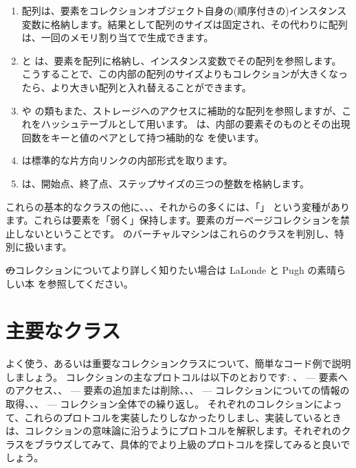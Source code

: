 \documentclass[a4paper,10pt,twoside]{book}
\begin{document}
\begin{enumerate}
  \item 配列は、要素をコレクションオブジェクト自身の(順序付きの)インスタンス変数に格納します。結果として配列のサイズは固定され、その代わりに配列は、一回のメモリ割り当てで生成できます。
  \item {} と  は、要素を配列に格納し、インスタンス変数でその配列を参照します。
  こうすることで、この内部の配列のサイズよりもコレクションが大きくなったら、より大きい配列と入れ替えることができます。
  \item {} や  の類もまた、ストレージへのアクセスに補助的な配列を参照しますが、これをハッシュテーブルとして用います。 は、内部の要素そのものとその出現回数をキーと値のペアとして持つ補助的な  を使います。
  \item {} は標準的な片方向リンクの内部形式を取ります。
  \item {} は、開始点、終了点、ステップサイズの三つの整数を格納します。
\end{enumerate}
これらの基本的なクラスの他に、、、それからの多くには、「」 という変種があります。これらは要素を「弱く」保持します。\ie 要素のガーベージコレクションを禁止しないということです。
\pharo のバーチャルマシンはこれらのクラスを判別し、特別に扱います。

\st のコレクションについてより詳しく知りたい場合は LaLonde と Pugh の素晴らしい本\cite{LaLo90a} を参照してください。

\section{主要なクラス}
よく使う、あるいは重要なコレクションクラスについて、簡単なコード例で説明しましょう。
コレクションの主なプロトコルは以下のとおりです: 、 --- 要素へのアクセス、、 --- 要素の追加または削除、、、 --- コレクションについての情報の取得、、、 --- コレクション全体での繰り返し。
それぞれのコレクションによって、これらのプロトコルを実装したりしなかったりしまし、実装しているときは、コレクションの意味論に沿うようにプロトコルを解釈します。それぞれのクラスをブラウズしてみて、具体的でより上級のプロトコルを探してみると良いでしょう。
\end{document}
